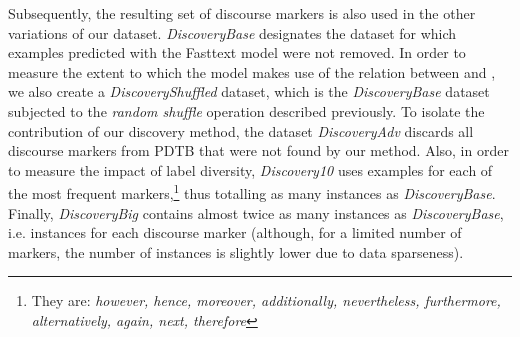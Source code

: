\documentclass[11pt,a4paper]{article}
\begin{document}
Subsequently, the resulting set of discourse markers is also used in the other variations of our dataset.  \textit{DiscoveryBase} designates the dataset for which examples predicted with the Fasttext model were not removed.  In order to measure the extent to which the model makes use of the relation between  and , we also create a \textit{DiscoveryShuffled} dataset, which is the \textit{DiscoveryBase} dataset subjected to the \textit{random shuffle} operation described previously. To isolate the contribution of our discovery method, the dataset {\it DiscoveryAdv} discards all discourse markers from PDTB that were not found by our method. Also, in order to measure the impact of label diversity, {\it Discovery10} uses  examples for each of the  most frequent markers,\footnote{They are: {\it however, hence, moreover, additionally, nevertheless, furthermore, alternatively, again, next, therefore}} thus totalling as many instances as {\it DiscoveryBase}.
Finally, \textit{DiscoveryBig} contains almost twice as many instances as {\it DiscoveryBase}, i.e.  instances for each discourse marker (although, for a limited number of markers, the number of instances is slightly lower due to data sparseness).
\end{document}
